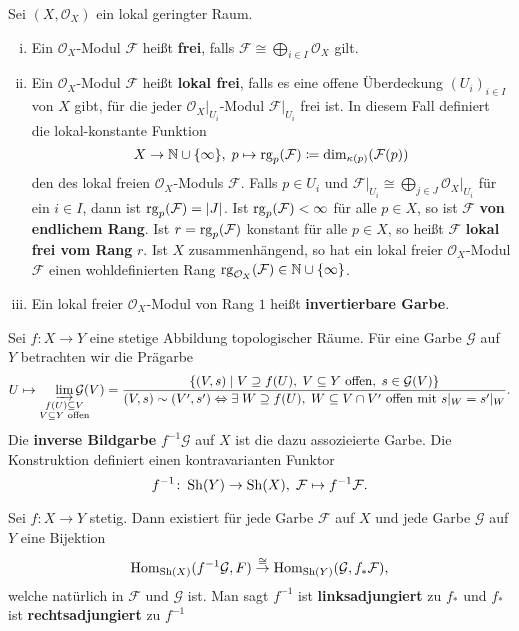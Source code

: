 \begin{defn}
	Sei $(X, \mathcal{O}_X)$ ein lokal geringter Raum.
	\begin{enumerate}[i)]
		\item Ein $\mathcal{O}_X$-Modul $\mathcal{F}$ heißt \textbf{frei}, falls $\mathcal{F} \cong \bigoplus_{i\in I}\mathcal{O}_X$ gilt.
		\item Ein $\mathcal{O}_X$-Modul $\mathcal{F}$ heißt \textbf{lokal frei}, falls es eine offene Überdeckung $(U_i)_{i\in I}$ von $X$ gibt, für die jeder $\mathcal{O}_X\vert_{U_i}$-Modul $\mathcal{F}\vert_{U_i}$ frei ist. In diesem Fall definiert die lokal-konstante Funktion
		\[
			X \to \mathbb {N} \cup \{\infty\}, \; p \mapsto \operatorname{rg}_p(\mathcal{F}) \coloneqq \dim_{\kappa(p)}(\mathcal{F}(p))
		\]
		den  des lokal freien $\mathcal{O}_X$-Moduls $\mathcal{F}$. Falls $p \in U_i$ und $\mathcal{F}\vert_{U_i} \cong \bigoplus_{j\in J} \mathcal{O}_X\vert_{U_i}$ für ein $i \in I$, dann ist $\operatorname{rg}_p(\mathcal{F}) = \left \lvert J \right \rvert$.
		Ist $\operatorname{rg}_p(\mathcal{F})< \infty$ für alle $p \in X$, so ist $\mathcal{F}$ \textbf{von endlichem Rang}. Ist $r = \operatorname{rg}_p(\mathcal{F})$ konstant für alle $p \in X$, so heißt $\mathcal{F}$ \textbf{lokal frei vom Rang} $r$. Ist $X$ zusammenhängend, so hat ein lokal freier $\mathcal{O}_X$-Modul $\mathcal{F}$ einen wohldefinierten Rang $\operatorname{rg}_{\mathcal{O}_X}(\mathcal{F}) \in \mathbb {N} \cup \{\infty\}$.
		\item Ein lokal freier $\mathcal{O}_X$-Modul von Rang $1$ heißt \textbf{invertierbare Garbe}.
	\end{enumerate}
\end{defn}

\begin{defn}
	Sei $f\colon X \to Y$ eine stetige Abbildung topologischer Räume. Für eine Garbe $\mathcal{G}$ auf $Y$ betrachten wir die Prägarbe
	\[
		U \mapsto \varinjlim_{\substack{f(U)\subseteq V\\V\subseteq Y \text{ offen}}} \quad\mathllap{\mathcal{G}(V)} = \frac{\{(V,s)\mid V \supseteq f(U),\; V \subseteq Y \text{ offen},\;s\in\mathcal{G}(V)\}}{(V,s)\sim(V',s') \Leftrightarrow \exists \;W \supseteq f(U),\; W \subseteq V \cap V' \text{ offen mit } s\vert_W = s'\vert_W}.
	\]
	Die \textbf{inverse Bildgarbe} $f^{-1}\mathcal{G}$ auf $X$ ist die dazu assozieierte Garbe. Die Konstruktion definiert einen kontravarianten Funktor
	\[
		f^{-1}\colon \operatorname{Sh}(Y) \to \operatorname{Sh}(X),\; \mathcal{F} \mapsto f^{-1}\mathcal{F}. 
	\]
\end{defn}

\begin{prop}
\label{prop:3.5}
	Sei $f\colon X \to Y$ stetig. Dann existiert für jede Garbe $\mathcal{F}$ auf $X$ und jede Garbe $\mathcal{G}$ auf $Y$ eine Bijektion
	\[
		\operatorname{Hom}_{\operatorname{Sh}(X)}(f^{-1}\mathcal{G},F) \overset{\cong}{\to} \operatorname{Hom}_{\operatorname{Sh}(Y)}(\mathcal{G},f_*\mathcal{F}),
	\]
	welche natürlich in $\mathcal{F}$ und $\mathcal{G}$ ist. Man sagt $f^{-1}$ ist \textbf{linksadjungiert} zu $f_*$ und $f_*$ ist \textbf{rechtsadjungiert} zu $f^{-1}$
\end{prop}

